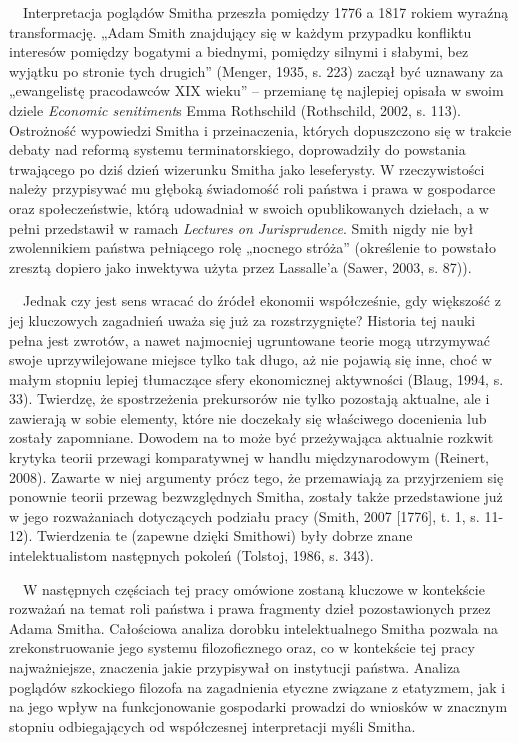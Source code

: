 \documentclass[a4paper]{article}
\begin{document}
 \ \ Interpretacja poglądów Smitha przeszła pomiędzy 1776 a 1817 rokiem wyraźną transformację. „Adam Smith znajdujący
się w każdym przypadku konfliktu interesów pomiędzy bogatymi a biednymi, pomiędzy silnymi i słabymi, bez wyjątku po
stronie tych drugich” \label{ref:RNDsAFNZfRokB}(Menger, 1935, s. 223) zaczął być uznawany za „ewangelistę pracodawców
XIX wieku” – przemianę tę najlepiej opisała w swoim dziele \textit{Economic senitiment}s Emma Rothschild
\label{ref:RNDs0eUTXaI1v}(Rothschild, 2002, s. 113). Ostrożność wypowiedzi Smitha i przeinaczenia, których dopuszczono
się w trakcie debaty nad reformą systemu terminatorskiego, doprowadziły do powstania trwającego po dziś dzień wizerunku
Smitha jako leseferysty. W rzeczywistości należy przypisywać mu głęboką świadomość roli państwa i prawa w gospodarce
oraz społeczeństwie, którą udowadniał w swoich opublikowanych dziełach, a w pełni przedstawił w ramach \textit{Lectures
on Jurisprudence}. Smith nigdy nie był zwolennikiem państwa pełniącego rolę „nocnego stróża” (określenie to powstało
zresztą dopiero jako inwektywa użyta przez Lassalle’a \label{ref:RNDPvkhPhffGM}(Sawer, 2003, s. 87)).

\ \ Jednak czy jest sens wracać do źródeł ekonomii współcześnie, gdy większość z jej kluczowych zagadnień uważa się już
za rozstrzygnięte? Historia tej nauki pełna jest zwrotów, a nawet najmocniej ugruntowane teorie mogą utrzymywać swoje
uprzywilejowane miejsce tylko tak długo, aż nie pojawią się inne, choć w małym stopniu lepiej tłumaczące sfery
ekonomicznej aktywności \label{ref:RNDIzKebFVZYU}(Blaug, 1994, s. 33). Twierdzę, że spostrzeżenia prekursorów nie tylko
pozostają aktualne, ale i zawierają w sobie elementy, które nie doczekały się właściwego docenienia lub zostały
zapomniane. Dowodem na to może być przeżywająca aktualnie rozkwit krytyka teorii przewagi komparatywnej w handlu
międzynarodowym \label{ref:RNDCycJKXS8KA}(Reinert, 2008). Zawarte w niej argumenty prócz tego, że przemawiają za
przyjrzeniem się ponownie teorii przewag bezwzględnych Smitha, zostały także przedstawione już w jego rozważaniach
dotyczących podziału pracy \label{ref:RNDtOabovEKbm}(Smith, 2007 [1776], t. 1, s. 11-12). Twierdzenia te (zapewne
dzięki Smithowi) były dobrze znane intelektualistom następnych pokoleń \label{ref:RND8shRFO5Ofw}(Tolstoj, 1986, s.
343).

\ \ W następnych częściach tej pracy omówione zostaną kluczowe w kontekście rozważań na temat roli państwa i prawa
fragmenty dzieł pozostawionych przez Adama Smitha. Całościowa analiza dorobku intelektualnego Smitha pozwala na
zrekonstruowanie jego systemu filozoficznego oraz, co w kontekście tej pracy najważniejsze, znaczenia jakie przypisywał
on instytucji państwa. Analiza poglądów szkockiego filozofa na zagadnienia etyczne związane z etatyzmem, jak i na jego
wpływ na funkcjonowanie gospodarki prowadzi do wniosków w znacznym stopniu odbiegających od współczesnej interpretacji
myśli Smitha.
\end{document}
